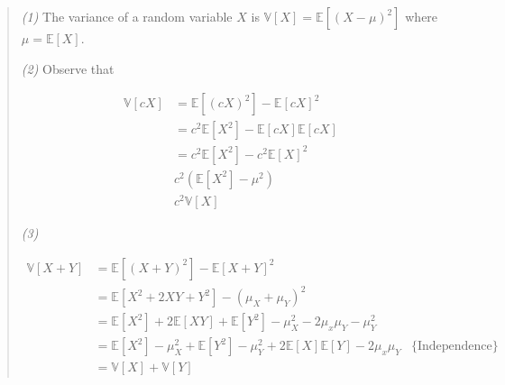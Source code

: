 \documentclass[a4paper, 12pt]{article}
\begin{document}
\small
\begin{quote}

\textit{(1)} The variance of a random variable $X$ is $\mathbb{V}\left[ X
\right] = \mathbb{E}\left[ (X - \mu)^2 \right] $ where $\mu = \mathbb{E}\left[ X
\right] $.

\textit{(2)} Observe that 

\begin{align*}
    \mathbb{V}\left[ cX \right] &= \mathbb{E}\left[ (cX)^2 \right] -
    \mathbb{E}\left[ cX \right]^2 \\ 
                                &=c^2 \mathbb{E} \left[ X^2 \right] -
                                \mathbb{E}\left[ cX \right] \mathbb{E}\left[ cX
                                \right]  \\ 
                                &= c^2 \mathbb{E}\left[ X^2 \right] -c^2
                                \mathbb{E}\left[ X \right] ^2 \\ 
                                &c^2 \left( \mathbb{E}\left[ X^2 \right] - \mu^2
                                \right)  \\ 
                                &c^2 \mathbb{V}\left[ X \right]
\end{align*}

\textit{(3)} 

\begin{align*}
    \mathbb{V}\left[ X + Y\right] &= \mathbb{E}\left[ (X+Y)^2 \right] -
    \mathbb{E}\left[ X + Y \right]^2 \\ 
                                  &=\mathbb{E}\left[ X^2 + 2XY + Y^2 \right] -
                                  \left( \mu_X + \mu_Y \right)^2 \\ 
                                  &=\mathbb{E}\left[ X^2 \right] + 2
                                  \mathbb{E}\left[ XY \right]  +
                                  \mathbb{E}\left[ Y^2 \right] - \mu_X^2 -
                                  2\mu_x\mu_Y - \mu_Y^2 \\ 
    &= \mathbb{E}\left[ X^2 \right] - \mu_X^2 + \mathbb{E}\left[ Y^2 \right] -
    \mu_Y^2 + 2\mathbb{E}\left[ X \right] \mathbb{E}\left[ Y \right] -
    2\mu_x\mu_Y &\{\text{Independence}\}\\ 
    &= \mathbb{V}\left[ X \right] + \mathbb{V}\left[ Y \right] 
\end{align*}

\end{quote}
\normalsize

\pagebreak 
\end{document}
